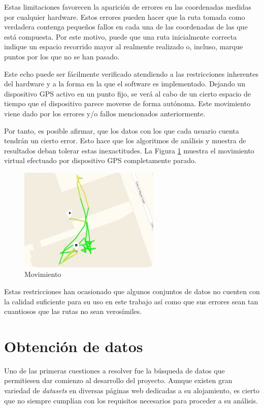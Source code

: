 Estas limitaciones favorecen la aparición de errores en las coordenadas medidas por cualquier hardware. Estos errores pueden hacer que la ruta tomada como verdadera contenga pequeños fallos en cada una de las coordenadas de las que está compuesta. Por este motivo, puede que una ruta inicialmente correcta indique un espacio recorrido mayor al realmente realizado o, incluso, marque puntos por los que no se han pasado.

Este echo puede ser fácilmente verificado atendiendo a las restricciones inherentes del hardware y a la forma en la que el software es implementado. Dejando un dispositivo GPS activo en un punto fijo, se verá al cabo de un cierto espacio de tiempo que el dispositivo parece moverse de forma autónoma. Este movimiento viene dado por los errores y/o fallos mencionados anteriormente.

Por tanto, es posible afirmar, que los datos con los que cada usuario cuenta tendrán un cierto error. Esto hace que los algoritmos de análisis y muestra de resultados deban tolerar estas inexactitudes. La Figura \ref{errores} muestra el movimiento virtual efectuado por dispositivo GPS completamente parado.

\begin{figure}[h]
  \centering
    \includegraphics[width=0.6\textwidth]{../img/gps/errores.jpg}
  \caption{Movimiento }
  \label{errores}
\end{figure}

Estas restricciones han ocasionado que algunos conjuntos de datos no cuenten con la calidad suficiente para su uso en este trabajo así como que sus errores sean tan cuantiosos que las rutas no sean verosímiles.

\section{Obtención de datos}
Uno de las primeras cuestiones a resolver fue la búsqueda de datos que permitiesen dar comienzo al desarrollo del proyecto. Aunque existen gran variedad de \textit{datasets} en diversas páginas web dedicadas a su alojamiento, es cierto que no siempre cumplían con los requisitos necesarios para proceder a su análisis.

